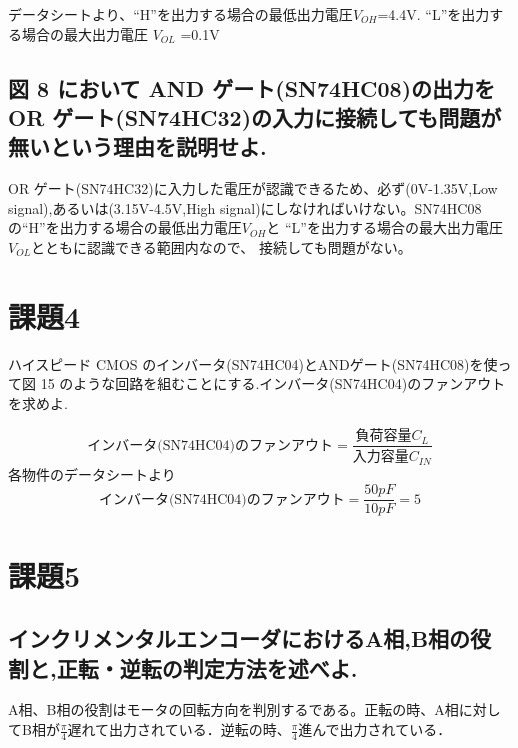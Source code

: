 \documentclass[xelatex,ja=standard,jafont=noto]{bxjsarticle}
\begin{document}
データシートより、“H”を出力する場合の最低出力電圧$  V_{OH} $=4.4V.
“L”を出力する場合の最大出力電圧 $  V_{OL} $ =0.1V

\subsection{図 8 において AND ゲート(SN74HC08)の出力を OR ゲート(SN74HC32)の入力に接続しても問題が無いという理由を説明せよ.}

OR ゲート(SN74HC32)に入力した電圧が認識できるため、必ず(0V-1.35V,Low signal),あるいは(3.15V-4.5V,High signal)にしなければいけない。SN74HC08の“H”を出力する場合の最低出力電圧$  V_{OH} $と “L”を出力する場合の最大出力電圧 $  V_{OL} $とともに認識できる範囲内なので、
接続しても問題がない。






\iffalse
ここでコメント
\fi







\section{課題4}
ハイスピード CMOS のインバータ(SN74HC04)とANDゲート(SN74HC08)を使って図 15
のような回路を組むことにする.インバータ(SN74HC04)のファンアウトを求めよ.

\begin{equation}
	\mbox{インバータ(SN74HC04)のファンアウト}=\frac{\mbox{負荷容量} C_{L}}{\mbox{入力容量} C_{IN}}
\end{equation}
各物件のデータシートより
\begin{equation}
	\mbox{インバータ(SN74HC04)のファンアウト}=\frac{50pF}{10pF}=5
\end{equation}





\iffalse
ここでコメント
\fi






\section{課題5}
\subsection{インクリメンタルエンコーダにおけるA相,B相の役割と,正転・逆転の判定方法を述べよ.}
A相、B相の役割はモータの回転方向を判別するである。正転の時、A相に対してB相が$  \frac{\pi}{4} $遅れて出力されている．逆転の時、$  \frac{\pi}{4} $進んで出力されている．
\end{document}
